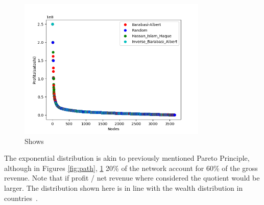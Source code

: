 \begin{figure}[!htb]
	\vspace{-3cm}
	\centering
	\includegraphics[width=9cm]{images/wealth_distribution_same.png}
	\caption{ Shows
	}
	\label{fig:same}
	\hspace*{2mm} 
\end{figure}

The exponential distribution is akin to previously mentioned Pareto Principle, although in Figures \ref{fig:path}, \ref{fig:same} 20\% of the network account for 60\% of the gross revenue. Note that if profit / net revenue where considered the quotient would be larger. The distribution shown here is in line with the wealth distribution in countries~\cite{credit:swiss:distribution}.

